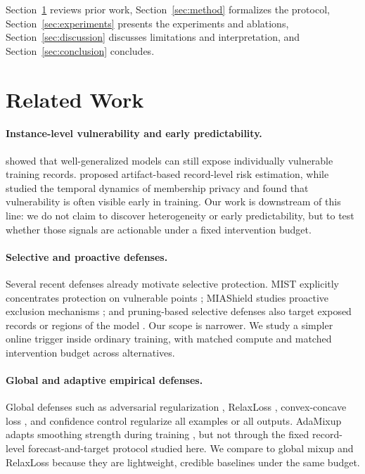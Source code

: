 \documentclass{article}
\begin{document}
Section~\ref{sec:related} reviews prior work, Section~\ref{sec:method} formalizes the protocol, Section~\ref{sec:experiments} presents the experiments and ablations, Section~\ref{sec:discussion} discusses limitations and interpretation, and Section~\ref{sec:conclusion} concludes.

\section{Related Work}
\label{sec:related}

\paragraph{Instance-level vulnerability and early predictability.}
\citet{long2018understanding} showed that well-generalized models can still expose individually vulnerable training records. \citet{pollock2024free} proposed artifact-based record-level risk estimation, while \citet{chen2025evaluating} studied the temporal dynamics of membership privacy and found that vulnerability is often visible early in training. Our work is downstream of this line: we do not claim to discover heterogeneity or early predictability, but to test whether those signals are actionable under a fixed intervention budget.

\paragraph{Selective and proactive defenses.}
Several recent defenses already motivate selective protection. MIST explicitly concentrates protection on vulnerable points \citep{li2024mist}; MIAShield studies proactive exclusion mechanisms \citep{jarin2022miashield}; and pruning-based selective defenses also target exposed records or regions of the model \citep{shang2025pruned}. Our scope is narrower. We study a simpler online trigger inside ordinary training, with matched compute and matched intervention budget across alternatives.

\paragraph{Global and adaptive empirical defenses.}
Global defenses such as adversarial regularization \citep{nasr2018adversarial}, RelaxLoss \citep{chen2022relaxloss}, convex-concave loss \citep{liu2024ccl}, and confidence control \citep{chen2024overconfidence} regularize all examples or all outputs. AdaMixup adapts smoothing strength during training \citep{chen2025adamixup}, but not through the fixed record-level forecast-and-target protocol studied here. We compare to global mixup and RelaxLoss because they are lightweight, credible baselines under the same budget.
\end{document}
